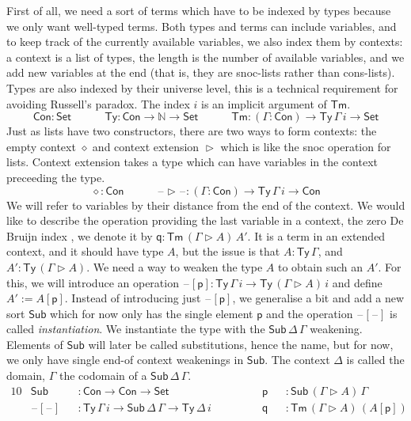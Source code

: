 \documentclass[a4paper,UKenglish,cleveref, autoref, thm-restate]{lipics-v2021}
\newcommand{\ra}{\rightarrow}
\newcommand{\Set}{\mathsf{Set}}
\newcommand{\Ty}{\mathsf{Ty}}
\newcommand{\Tm}{\mathsf{Tm}}
\newcommand{\Con}{\mathsf{Con}}
\newcommand{\Sub}{\mathsf{Sub}}
\newcommand{\p}{\mathsf{p}}
\newcommand{\q}{\mathsf{q}}
\newcommand{\ext}{\mathop{\triangleright}}
\newcommand{\N}{\mathbb{N}}
\newcommand{\blank}{\mathord{\hspace{1pt}\text{--}\hspace{1pt}}} %
\begin{document}
First of all, we need a sort of terms which have to be indexed by
types because we only want well-typed terms. Both types and terms can
include variables, and to keep track of the currently available
variables, we also index them by contexts: a context is a list of
types, the length is the number of available variables, and we add new
variables at the end (that is, they are snoc-lists rather than
cons-lists). Types are also indexed by their universe level, this is a
technical requirement for avoiding Russell's paradox. The index $i$ is
an implicit argument of $\Tm$.
\[
\Con : \Set \hspace{3em} 
\Ty : \Con\ra\N\ra\Set \hspace{3em} 
\Tm : (\Gamma:\Con)\ra\Ty\,\Gamma\,i\ra\Set
\]
Just as lists have two constructors, there are two ways to form
contexts: the empty context $\diamond$ and context extension $\ext$
which is like the snoc operation for lists. Context extension takes a
type which can have variables in the context preceeding the type.
\[
\diamond : \Con \hspace{3em}
\blank\ext\blank : (\Gamma:\Con)\ra\Ty\,\Gamma\,i\ra\Con
\]
We will refer to variables by their distance from the end of the
context. We would like to describe the operation providing the last
variable in a context, the zero De Bruijn index \cite{debruijn}, we
denote it by $\q : \Tm\,(\Gamma\ext A)\,A'$. It is a term in an
extended context, and it should have type $A$, but the issue is that
$A : \Ty\,\Gamma$, and $A' : \Ty\,(\Gamma\ext A)$. We need a way to
weaken the type $A$ to obtain such an $A'$. For this, we will
introduce an operation $\blank[\p] : \Ty\,\Gamma\,i\ra\Ty\,(\Gamma\ext
A)\,i$ and define $A' := A[\p]$. Instead of introducing just
$\blank[\p]$, we generalise a bit and add a new sort $\Sub$ which for
now only has the single element $\p$ and the operation
$\blank[\blank]$ is called \emph{instantiation}. We instantiate the
type with the $\Sub\,\Delta\,\Gamma$ weakening.  Elements of $\Sub$
will later be called substitutions, hence the name, but for now, we
only have single end-of context weakenings in $\Sub$. The context
$\Delta$ is called the domain, $\Gamma$ the codomain of a
$\Sub\,\Delta\,\Gamma$.
\begin{alignat*}{10}
  & \Sub && : \Con\ra\Con\ra\Set && \p && : \Sub\,(\Gamma\ext A)\,\Gamma \\
  & \blank[\blank] && : \Ty\,\Gamma\,i\ra\Sub\,\Delta\,\Gamma\ra\Ty\,\Delta\,i \hspace{3em} && \q && : \Tm\,(\Gamma\ext A)\,(A[\p])
\end{alignat*}
\end{document}
